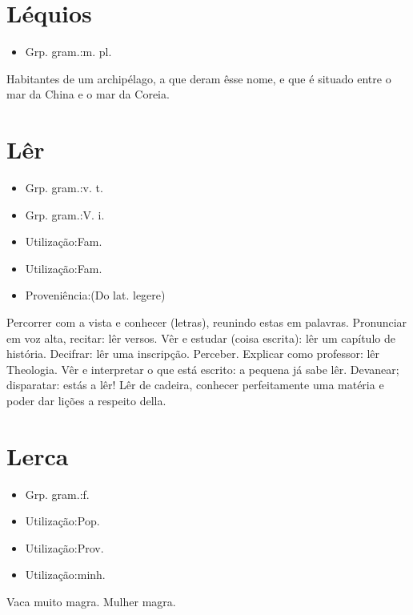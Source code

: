 \section{Léquios}
\begin{itemize}
\item {Grp. gram.:m. pl.}
\end{itemize}
Habitantes de um archipélago, a que deram êsse nome, e que é situado entre o mar da China e o mar da Coreia.
\section{Lêr}
\begin{itemize}
\item {Grp. gram.:v. t.}
\end{itemize}
\begin{itemize}
\item {Grp. gram.:V. i.}
\end{itemize}
\begin{itemize}
\item {Utilização:Fam.}
\end{itemize}
\begin{itemize}
\item {Utilização:Fam.}
\end{itemize}
\begin{itemize}
\item {Proveniência:(Do lat. \textunderscore legere\textunderscore )}
\end{itemize}
Percorrer com a vista e conhecer (letras), reunindo estas em palavras.
Pronunciar em voz alta, recitar: \textunderscore lêr versos\textunderscore .
Vêr e estudar (coisa escrita): \textunderscore lêr um capítulo de história\textunderscore .
Decifrar: \textunderscore lêr uma inscripção\textunderscore .
Perceber.
Explicar como professor: \textunderscore lêr Theologia\textunderscore .
Vêr e interpretar o que está escrito: \textunderscore a pequena já sabe lêr\textunderscore .
Devanear; disparatar: \textunderscore estás a lêr!\textunderscore 
\textunderscore Lêr de cadeira\textunderscore , conhecer perfeitamente uma matéria e poder dar lições a respeito della.
\section{Lerca}
\begin{itemize}
\item {Grp. gram.:f.}
\end{itemize}
\begin{itemize}
\item {Utilização:Pop.}
\end{itemize}
\begin{itemize}
\item {Utilização:Prov.}
\end{itemize}
\begin{itemize}
\item {Utilização:minh.}
\end{itemize}
Vaca muito magra.
Mulher magra.
